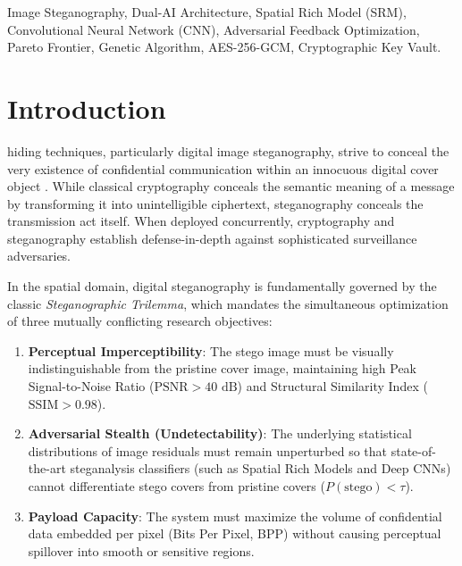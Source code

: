 \documentclass[conference]{IEEEtran}
\begin{document}
\begin{IEEEkeywords}
Image Steganography, Dual-AI Architecture, Spatial Rich Model (SRM), Convolutional Neural Network (CNN), Adversarial Feedback Optimization, Pareto Frontier, Genetic Algorithm, AES-256-GCM, Cryptographic Key Vault.
\end{IEEEkeywords}

\section{Introduction}
 hiding techniques, particularly digital image steganography, strive to conceal the very existence of confidential communication within an innocuous digital cover object \cite{wang2004image}. While classical cryptography conceals the semantic meaning of a message by transforming it into unintelligible ciphertext, steganography conceals the transmission act itself. When deployed concurrently, cryptography and steganography establish defense-in-depth against sophisticated surveillance adversaries.

In the spatial domain, digital steganography is fundamentally governed by the classic \textit{Steganographic Trilemma}, which mandates the simultaneous optimization of three mutually conflicting research objectives:
\begin{enumerate}
    \item \textbf{Perceptual Imperceptibility}: The stego image must be visually indistinguishable from the pristine cover image, maintaining high Peak Signal-to-Noise Ratio ($\text{PSNR} > 40\text{ dB}$) and Structural Similarity Index ($\text{SSIM} > 0.98$).
    \item \textbf{Adversarial Stealth (Undetectability)}: The underlying statistical distributions of image residuals must remain unperturbed so that state-of-the-art steganalysis classifiers (such as Spatial Rich Models and Deep CNNs) cannot differentiate stego covers from pristine covers ($P(\text{stego}) < \tau$).
    \item \textbf{Payload Capacity}: The system must maximize the volume of confidential data embedded per pixel (Bits Per Pixel, BPP) without causing perceptual spillover into smooth or sensitive regions.
\end{enumerate}
\end{document}
